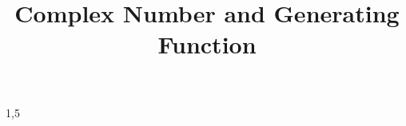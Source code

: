 \documentclass[a4paper,12pt]{article}
\begin{document}
\toggletrue{ownans}
\title{Complex Number and Generating Function}
\newcommand\event{S.3,4 Elite Mathematics Training}
\newcommand\learningobjective{
\item Have the general picture of Complex numbers and Trigonometry Functions
\item Learn the concept of Generating Functions
}

\myfrontpage





\begin{question}[]{1,5}








\end{question}
\end{document}
